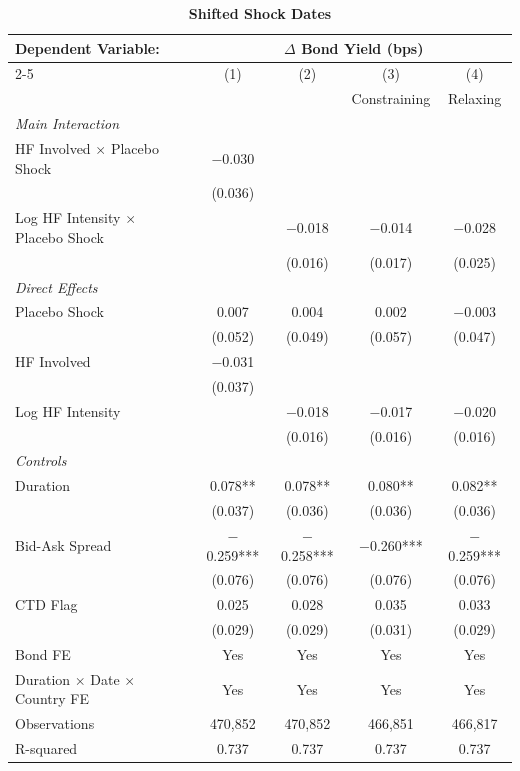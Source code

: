 \documentclass[english, 11pt, oneside]{article}
\begin{document}
\begin{table}[h!]
\centering
\caption{\textbf{Shifted Shock Dates}}
\footnotesize
\setlength{\tabcolsep}{8pt}
\renewcommand{\arraystretch}{1.1}
\begin{tabular}{l c c c c}
\toprule
\textbf{Dependent Variable:} & \multicolumn{4}{c}{\textbf{$\Delta$ Bond Yield (bps)}} \\
\cmidrule(lr){2-5}
 & (1) & (2) & (3) & (4) \\
 & & & Constraining & Relaxing \\
\midrule
\textit{Main Interaction} & & & & \\
HF Involved $\times$ Placebo Shock & $-$0.030 & & & \\
 & (0.036) & & & \\
Log HF Intensity $\times$ Placebo Shock & & $-$0.018 & $-$0.014 & $-$0.028 \\
 & & (0.016) & (0.017) & (0.025) \\
\addlinespace
\textit{Direct Effects} & & & & \\
Placebo Shock & 0.007 & 0.004 & 0.002 & $-$0.003 \\
 & (0.052) & (0.049) & (0.057) & (0.047) \\
HF Involved & $-$0.031 & & & \\
 & (0.037) & & & \\
Log HF Intensity & & $-$0.018 & $-$0.017 & $-$0.020 \\
 & & (0.016) & (0.016) & (0.016) \\
\addlinespace
\textit{Controls} & & & & \\
Duration & 0.078** & 0.078** & 0.080** & 0.082** \\
 & (0.037) & (0.036) & (0.036) & (0.036) \\
Bid-Ask Spread & $-$0.259*** & $-$0.258*** & $-$0.260*** & $-$0.259*** \\
 & (0.076) & (0.076) & (0.076) & (0.076) \\
CTD Flag & 0.025 & 0.028 & 0.035 & 0.033 \\
 & (0.029) & (0.029) & (0.031) & (0.029) \\
\midrule
Bond FE & Yes & Yes & Yes & Yes \\
Duration $\times$ Date $\times$ Country FE & Yes & Yes & Yes & Yes \\
\midrule
Observations & 470,852 & 470,852 & 466,851 & 466,817 \\
R-squared & 0.737 & 0.737 & 0.737 & 0.737 \\
\bottomrule
\end{tabular}

\end{table}
\end{document}
